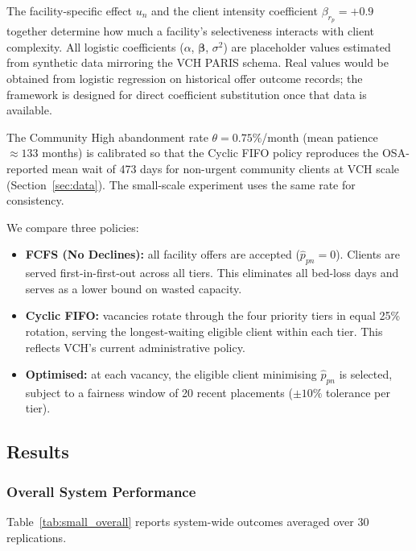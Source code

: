 The facility-specific effect $u_n$ and the client intensity coefficient
$\beta_{r_p} = +0.9$ together determine how much a facility's selectiveness
interacts with client complexity. All logistic coefficients
($\alpha$, $\boldsymbol{\beta}$, $\sigma^2$) are placeholder values estimated
from synthetic data mirroring the VCH PARIS schema. Real values would be
obtained from logistic regression on historical offer outcome records; the
framework is designed for direct coefficient substitution once that data is
available.

The Community High abandonment rate $\theta = 0.75\%$/month (mean patience
$\approx 133$ months) is calibrated so that the Cyclic FIFO policy reproduces
the OSA-reported mean wait of 473 days for non-urgent community clients at
VCH scale (Section~\ref{sec:data}). The small-scale experiment uses the same
rate for consistency.

We compare three policies:

\begin{itemize}
  \item \textbf{FCFS (No Declines):} all facility offers are accepted
        ($\hat{p}_{pn} = 0$). Clients are served first-in-first-out across all
        tiers. This eliminates all bed-loss days and serves as a lower bound on
        wasted capacity.
  \item \textbf{Cyclic FIFO:} vacancies rotate through the four priority tiers
        in equal 25\% rotation, serving the longest-waiting eligible client
        within each tier. This reflects VCH's current administrative policy.
  \item \textbf{Optimised:} at each vacancy, the eligible client minimising
        $\hat{p}_{pn}$ is selected, subject to a fairness window of 20 recent
        placements ($\pm 10\%$ tolerance per tier).
\end{itemize}

\subsection{Results}

\subsubsection*{Overall System Performance}

Table~\ref{tab:small_overall} reports system-wide outcomes averaged over 30 replications.

